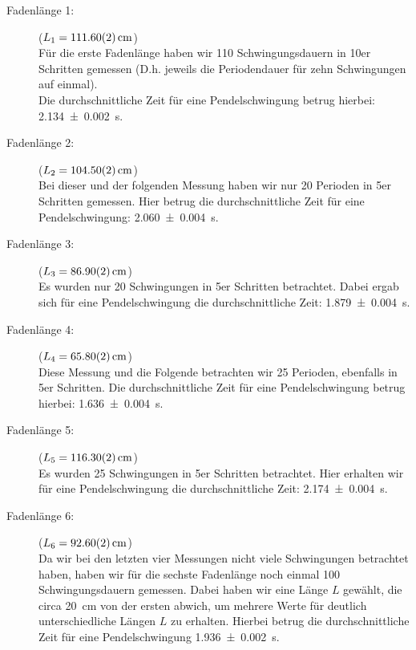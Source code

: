 \documentclass[11pt,a4paper,titlepage, ngerman]{article}
\begin{document}
		\begin{description}
			
			\item[Fadenlänge 1:]($L_1 = \SI{111,6 +- 0,02}{cm}$)\\
			Für die erste Fadenlänge haben wir 110 Schwingungsdauern in 10er Schritten gemessen (D.h. jeweils die Periodendauer für zehn Schwingungen auf einmal). \\
			Die durchschnittliche Zeit für eine Pendelschwingung betrug hierbei: \SI{2.134 +- 0,002}{s}.
			
			\item[Fadenlänge 2:]($L_2 = \SI{104,5 +- 0,02}{cm}$)\\ 				 
			Bei dieser und der folgenden Messung haben wir nur 20 Perioden in 5er Schritten gemessen. Hier betrug die durchschnittliche Zeit für eine Pendelschwingung: \SI{2,060 +- 0,004}{s}.
			
			\item[Fadenlänge 3:]($L_3 = \SI{86,9 +- 0,02}{cm}$)\\ 			
			Es wurden nur 20 Schwingungen in 5er Schritten betrachtet. Dabei ergab sich für eine Pendelschwingung die durchschnittliche Zeit: \SI{1,879 +- 0,004}{s}.	
			
			\item[Fadenlänge 4:]($L_4 = \SI{65,8 +- 0,02}{cm}$)\\ 				
			Diese Messung und die Folgende betrachten wir 25 Perioden, ebenfalls in 5er Schritten. Die durchschnittliche Zeit für eine Pendelschwingung betrug hierbei: \SI{1,636 +- 0,004}{s}.
			
			\item[Fadenlänge 5:]($L_5 = \SI{116,3 +- 0,02}{cm}$)\\ 				
			Es wurden 25 Schwingungen in 5er Schritten betrachtet. Hier erhalten wir für eine Pendelschwingung die durchschnittliche Zeit: \SI{2,174 +- 0,004}{s}.
			
			\item[Fadenlänge 6:]($L_6 = \SI{92,6 +- 0,02}{cm}$)\\ 				
			Da wir bei den letzten vier Messungen nicht viele Schwingungen betrachtet haben, haben wir für die sechste Fadenlänge noch einmal 100 Schwingungsdauern gemessen. Dabei haben wir eine Länge $L$ gewählt, die circa \SI{20}{cm} von der ersten abwich, um mehrere Werte für \glqq deutlich\grqq{} unterschiedliche Längen $L$ zu erhalten. 
			Hierbei betrug die durchschnittliche Zeit für eine Pendelschwingung \SI{1,936 +- 0,002}{s}.
				
		\end{description}
		
\end{document}
